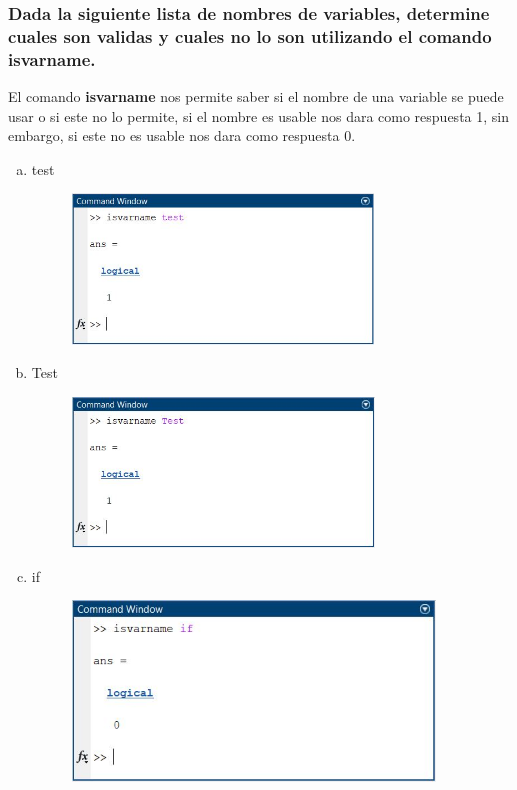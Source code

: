\documentclass{article}
\begin{document}
\subsubsection{Dada la siguiente lista de nombres de variables, determine cuales son validas y cuales no lo son utilizando el comando isvarname.}

El comando \textbf{isvarname} nos permite saber si el nombre de una variable se puede usar o si este no lo permite, si el nombre es usable nos dara como respuesta 1, sin embargo, si este no es usable nos dara como respuesta 0.

\begin{enumerate}[a)]
    \item test
        \begin{figure}[H]
        \centering
        \includegraphics[height=4cm]{img6a.jpg}
        \end{figure}
    \item Test
        \begin{figure}[H]
        \centering
        \includegraphics[height=4cm]{img6b.jpg}
        \end{figure}
    \item if
        \begin{figure}[H]
        \centering
        \includegraphics[height=4.8cm]{img6c.jpg}

\end{figure}
\end{enumerate}
\end{document}
